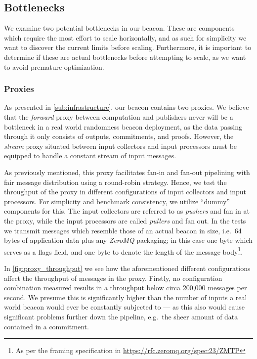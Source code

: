 \subsection{Bottlenecks}%
\label{sub:bottlenecks}
We examine two potential bottlenecks in our beacon.
These are components which require the most effort to scale horizontally, and as such for simplicity we want to discover the current limits before scaling.
Furthermore, it is important to determine if these are actual bottlenecks before attempting to scale, as we want to avoid premature optimization.

\subsubsection{Proxies}%
\label{ssub:proxies}
As presented in \vref{sub:infrastructure}, our beacon contains two proxies.
We believe that the \textit{forward} proxy between computation and publishers never will be a bottleneck in a real world randomness beacon deployment, as the data passing through it only consists of outputs, commitments, and proofs.
However, the \textit{stream} proxy situated between input collectors and input processors must be equipped to handle a constant stream of input messages.

As previously mentioned, this proxy facilitates fan-in and fan-out pipelining with fair message distribution using a round-robin strategy.
Hence, we test the throughput of the proxy in different configurations of input collectors and input processors.
For simplicity and benchmark consistency, we utilize \enquote{dummy} components for this.
The input collectors are referred to as \textit{pushers} and fan in at the proxy, while the input processors are called \textit{pullers} and fan out.
In the tests we transmit messages which resemble those of an actual beacon in size, i.e.\ 64 bytes of application data plus any \textit{ZeroMQ} packaging; in this case one byte which serves as a flags field, and one byte to denote the length of the message body\footnote{As per the framing specification in \url{https://rfc.zeromq.org/spec:23/ZMTP}}.

In \vref{fig:proxy_throughput} we see how the aforementioned different configurations affect the throughput of messages in the proxy.
Firstly, no configuration combination measured results in a throughput below circa 200,000 messages per second.
We presume this is significantly higher than the number of inputs a real world beacon would ever be constantly subjected to --- as this also would cause significant problems further down the pipeline, e.g.\ the sheer amount of data contained in a commitment.

